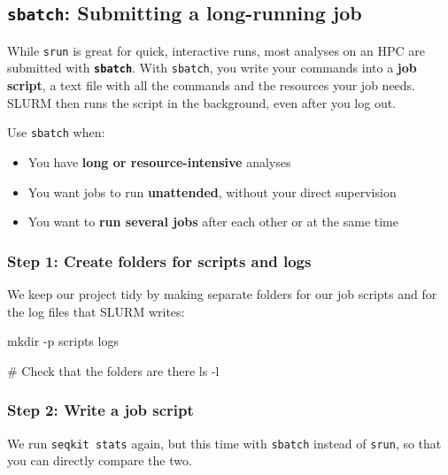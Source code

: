 \documentclass[
  letterpaper,
  DIV=11,
  numbers=noendperiod]{scrreprt}
\newenvironment{Shaded}{}{}
\newcommand{\AttributeTok}[1]{\textcolor[rgb]{0.84,0.23,0.29}{#1}}
\newcommand{\CommentTok}[1]{\textcolor[rgb]{0.42,0.45,0.49}{#1}}
\newcommand{\FunctionTok}[1]{\textcolor[rgb]{0.44,0.26,0.76}{#1}}
\newcommand{\NormalTok}[1]{\textcolor[rgb]{0.14,0.16,0.18}{#1}}
\providecommand{\tightlist}{%
  \setlength{\itemsep}{0pt}\setlength{\parskip}{0pt}}
\begin{document}
\subsection{\texorpdfstring{\texttt{sbatch}: Submitting a long-running
job}{sbatch: Submitting a long-running job}}\label{sbatch-submitting-a-long-running-job}

While \texttt{srun} is great for quick, interactive runs, most analyses
on an HPC are submitted with \textbf{\texttt{sbatch}}. With
\texttt{sbatch}, you write your commands into a \textbf{job script}, a
text file with all the commands and the resources your job needs. SLURM
then runs the script in the background, even after you log out.

Use \texttt{sbatch} when:

\begin{itemize}
\tightlist
\item
  You have \textbf{long or resource-intensive} analyses
\item
  You want jobs to run \textbf{unattended}, without your direct
  supervision
\item
  You want to \textbf{run several jobs} after each other or at the same
  time
\end{itemize}

\subsubsection{Step 1: Create folders for scripts and
logs}\label{step-1-create-folders-for-scripts-and-logs}

We keep our project tidy by making separate folders for our job scripts
and for the log files that SLURM writes:

\begin{Shaded}
\begin{Highlighting}[]
\FunctionTok{mkdir} \AttributeTok{{-}p}\NormalTok{ scripts logs}

\CommentTok{\# Check that the folders are there}
\FunctionTok{ls} \AttributeTok{{-}l}
\end{Highlighting}
\end{Shaded}

\subsubsection{Step 2: Write a job
script}\label{step-2-write-a-job-script}

We run \texttt{seqkit\ stats} again, but this time with \texttt{sbatch}
instead of \texttt{srun}, so that you can directly compare the two.
\end{document}
